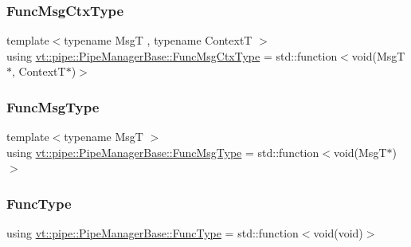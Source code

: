 \mbox{\label{structvt_1_1pipe_1_1_pipe_manager_base_a73fdf82ece0411b3dc644c99b763f7a9}} 
\subsubsection{\texorpdfstring{Func\+Msg\+Ctx\+Type}{FuncMsgCtxType}}
{\footnotesize\ttfamily template$<$typename MsgT , typename ContextT $>$ \\
using \hyperlink{structvt_1_1pipe_1_1_pipe_manager_base_a73fdf82ece0411b3dc644c99b763f7a9}{vt\+::pipe\+::\+Pipe\+Manager\+Base\+::\+Func\+Msg\+Ctx\+Type} =  std\+::function$<$void(MsgT$\ast$, ContextT$\ast$)$>$}

\mbox{\label{structvt_1_1pipe_1_1_pipe_manager_base_aa54eee64ab32a27777a672d49eb861f4}} 
\subsubsection{\texorpdfstring{Func\+Msg\+Type}{FuncMsgType}}
{\footnotesize\ttfamily template$<$typename MsgT $>$ \\
using \hyperlink{structvt_1_1pipe_1_1_pipe_manager_base_aa54eee64ab32a27777a672d49eb861f4}{vt\+::pipe\+::\+Pipe\+Manager\+Base\+::\+Func\+Msg\+Type} =  std\+::function$<$void(MsgT$\ast$)$>$}

\mbox{\label{structvt_1_1pipe_1_1_pipe_manager_base_a7ddc75a14fa50cd8521641ef6f9ea78d}} 
\subsubsection{\texorpdfstring{Func\+Type}{FuncType}}
{\footnotesize\ttfamily using \hyperlink{structvt_1_1pipe_1_1_pipe_manager_base_a7ddc75a14fa50cd8521641ef6f9ea78d}{vt\+::pipe\+::\+Pipe\+Manager\+Base\+::\+Func\+Type} =  std\+::function$<$void(void)$>$}

